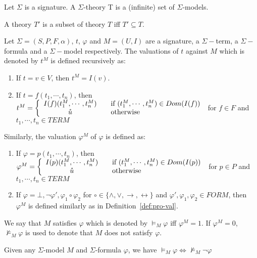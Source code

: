 \begin{definition}
Let $\Sigma$ is a signature. A $\Sigma$-theory T is a (infinite) set of $\Sigma$-models.
\end{definition}
A theory $T'$ is a subset of theory $T$ iff $T' \subseteq T$.

\begin{definition}
Let $\Sigma = (S, P, F, \alpha)$, $t$, $\varphi$ and $M=(U, I)$ are a signature, a $\Sigma-$term, a $\Sigma-$formula and a $\Sigma-$model respectively. The valuations of $t$ against $M$ which is denoted by $t^M$ is defined recursively as:
\begin{enumerate}
\item If $t = v \in V$, then $t^M = I(v)$.
\item If $t = f(t_1, \cdots, t_n)$, then $t^M = \left\{ 
  \begin{array}{c l}
    I(f)(t_1^M, \cdots, t_n^M) & \quad \text{if } (t_1^M, \cdots, t_n^M) \in Dom(I(f))\\
    \mathring{u} & \quad \text{otherwise }\\
  \end{array} \right.$ for $f \in F$ and $t_1,\cdots, t_n \in TERM$
\end{enumerate}
Similarly, the valuation $\varphi^M$ of $\varphi$ is defined as:
\begin{enumerate}
\item If $\varphi = p(t_1,\cdots,t_n)$, then $\varphi^M = \left\{ 
  \begin{array}{c l}
    I(p)(t_1^M,\cdots,t_n^M) & \quad \text{if } (t_1^M, \cdots, t_n^M) \in Dom(I(p))\\
    \mathring{u} & \quad \text{otherwise }\\
  \end{array} \right.$ for $p \in P$ and $t_1,\cdots, t_n \in TERM$
\item If $\varphi = \bot, \neg\varphi', \varphi_1 \circ \varphi_2$ for $\circ \in \{\wedge, \vee, \rightarrow, \leftrightarrow\}$ and $\varphi', \varphi_1, \varphi_2 \in FORM$, then $\varphi^M$ is defined similarly as in Definition~\ref{def:pro-val}.
\end{enumerate}
We say that $M$ satisfies $\varphi$ which is denoted by $\models_M \varphi$ iff $\varphi^M = 1$. If $\varphi^M = 0$, $\not\models_M \varphi$ is used to denote that $M$ does not satisfy $\varphi$.
\end{definition}

\begin{lemma}\label{lemma:model-sat-unsat}
Given any $\Sigma$-model $M$ and $\Sigma$-formula $\varphi$, we have $\models_M \varphi \iff \not\models_M \neg \varphi$
\end{lemma}

